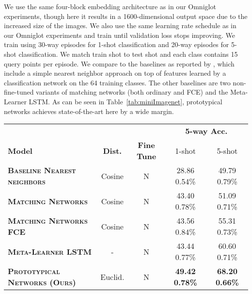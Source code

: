 \documentclass{article}
\def\abovestrut#1{\rule[0in]{0in}{#1}\ignorespaces}
\def\belowstrut#1{\rule[-#1]{0in}{#1}\ignorespaces}
\def\abovespace{\abovestrut{0.20in}}
\def\belowspace{\belowstrut{0.10in}}
\begin{document}
We use the same four-block embedding architecture as in our Omniglot experiments, though here it results in a 1600-dimensional output space due to the increased size of the images. We also use the same learning rate schedule as in our Omniglot experiments and train until validation loss stops improving. We train using 30-way episodes for 1-shot classification and 20-way episodes for 5-shot classification. We match train shot to test shot and each class contains 15 query points per episode.  We compare to the baselines as reported by \citet{ravi2017meta}, which include a simple nearest neighbor approach on top of features learned by a classification network on the 64 training classes. The other baselines are two non-fine-tuned variants of matching networks (both ordinary and FCE) and the Meta-Learner LSTM.
As can be seen in Table~\ref{tab:miniImagenet}, prototypical networks achieves state-of-the-art here by a wide margin.
\begin{table*}[tb]
\caption{Few-shot classification accuracies on \textit{mini}ImageNet. All accuracy results are averaged over 600 test episodes and are reported with 95\% confidence intervals. \textsuperscript{}Results reported by \cite{ravi2017meta}.}
\vskip -0.1in
\label{tab:miniImagenet}
\begin{center}
\begin{small}
\begin{tabular}{lcccc}
\hline
\abovespace
&&& \multicolumn{2}{c}{\textbf{5-way Acc.}} \\
\belowspace
\textbf{Model} & \textbf{Dist.} & \textbf{Fine Tune} & 1-shot & 5-shot \\
\hline
\abovespace
\textbf{\textsc{Baseline Nearest neighbors}}\textsuperscript{} & Cosine & N & 28.86  0.54\% & 49.79  0.79\% \\
\textbf{\textsc{Matching Networks}} \citep{vinyals2016matching}\textsuperscript{} & Cosine & N & 43.40  0.78\% & 51.09  0.71\% \\
\textbf{\textsc{Matching Networks FCE}} \citep{vinyals2016matching}\textsuperscript{} & Cosine & N & 43.56  0.84\% & 55.31  0.73\% \\
\textbf{\textsc{Meta-Learner LSTM}} \citep{ravi2017meta}\textsuperscript{} & - & N & 43.44  0.77\% & 60.60  0.71\% \\
\belowspace
\textbf{\textsc{Prototypical Networks (Ours)}} & Euclid. & N & \textbf{49.42  0.78\%} & \textbf{68.20  0.66\%}\\
\hline
\end{tabular}
\end{small}
\end{center}
\end{table*}
\end{document}
